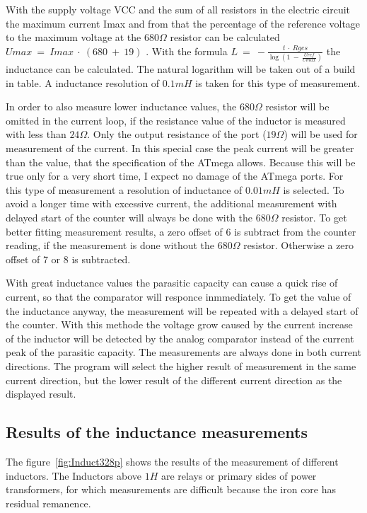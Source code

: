 With the supply voltage VCC and the sum of all resistors in the electric circuit the maximum current Imax and from
that the percentage of the reference voltage to the maximum voltage at the \(680\Omega\) resistor can be calculated
\(Umax~=~Imax~\cdot~(680~+~19)\) .
With the formula \(L~=~-\frac{t~\cdot~Rges}{\log{(1~-~\frac{Uref}{Umax})}}\) the inductance can be calculated.
The natural logarithm will be taken out of a build in table.
A inductance resolution of \(0.1mH\) is taken for this type of measurement.


In order to also measure lower inductance values, the \(680\Omega\) resistor will be omitted in the current loop,
if the resistance value of the inductor is measured with less than \(24\Omega\).
Only the output resistance of the port (\(19\Omega\)) will be used for measurement of the current.
In this special case the peak current will be greater than the value, that the specification of the ATmega allows.
Because this will be true only for a very short time, I expect no damage of the ATmega ports.
For this type of measurement a resolution of inductance of \(0.01mH\) is selected.
To avoid a longer time with excessive current, the additional measurement with delayed start of the counter will always be
done with the \(680\Omega\) resistor.
To get better fitting measurement results, a zero offset of 6 is subtract from the counter reading, 
if the measurement is done without the \(680\Omega\) resistor. Otherwise a zero offset of 7 or 8 is subtracted.


With great inductance values the parasitic capacity can cause a quick rise of current, so that the comparator
will responce inmmediately.
To get the value of the inductance anyway, the measurement will be repeated with a delayed start of the counter.
With this methode the voltage grow caused by the current increase of the inductor will be detected by the
analog comparator instead of the current peak of the parasitic capacity.
The measurements are always done in both current directions.
The program will select the higher result of measurement in the same current direction, but the
lower result of the different current direction as the displayed result.

\subsection{Results of the inductance measurements}
The figure~\ref{fig:Induct328p} shows the results of the measurement of different inductors.
The Inductors above \(1H\) are relays or primary sides of power transformers, for which
measurements are difficult because the iron core has residual remanence.


